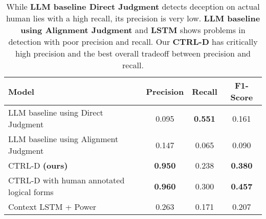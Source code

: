 \begin{table*}[h]
    \centering
    \begin{tabular}{lccc}
        \hline
        \textbf{Model} & \textbf{Precision} & \textbf{Recall} & \textbf{F1-Score} \\
        \hline
        LLM baseline using Direct Judgment & 0.095 & \textbf{0.551} &0.161 \\
        LLM baseline using Alignment Judgment & 0.147 & 0.065 & 0.090  \\
        CTRL-D \textbf{(ours)} & \textbf{0.950} & 0.238 & \textbf{0.380} \\
        \hspace{3mm}  CTRL-D with human annotated logical forms  & \textbf{0.960} & 0.300 & \textbf{0.457} \\
        Context LSTM + Power 
         & 0.263 & 0.171 & 0.207 \\ 
        \hline
    \end{tabular}
    \caption{While \textbf{LLM baseline Direct Judgment} detects deception on actual human lies with a high recall, its precision is very low. \textbf{LLM baseline using Alignment Judgment} and \citet{peskov2020takes} \textbf{LSTM} shows problems in detection with poor precision and recall. Our \textbf{CTRL-D} has  critically high precision and the best overall tradeoff between precision and recall.}
    \label{tab:1K_results}
\end{table*}
